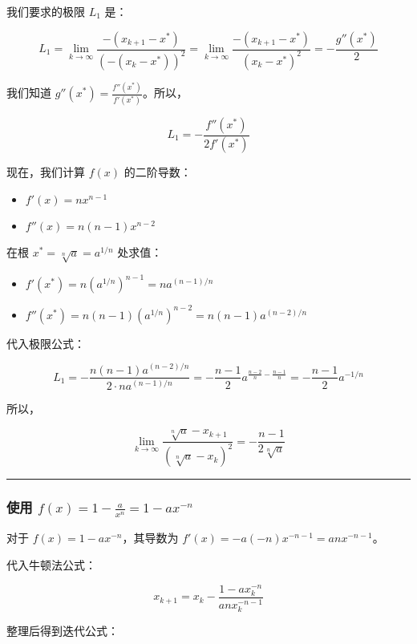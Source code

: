 \documentclass[11pt]{article}
\providecommand{\tightlist}{%
      \setlength{\itemsep}{0pt}\setlength{\parskip}{0pt}}
\begin{document}
我们要求的极限 \(L_1\) 是：

\[ L_1 = \lim_{k\to\infty} \frac{-(x_{k+1} - x^*)}{(-(x_k - x^*))^2} = \lim_{k\to\infty} \frac{-(x_{k+1} - x^*)}{(x_k - x^*)^2} = -\frac{g''(x^*)}{2} \]

我们知道 \(g''(x^*) = \frac{f''(x^*)}{f'(x^*)}\)。所以，

\[ L_1 = -\frac{f''(x^*)}{2f'(x^*)} \]

现在，我们计算 \(f(x)\) 的二阶导数：

\begin{itemize}
\tightlist
\item
  \(f'(x) = nx^{n-1}\)
\item
  \(f''(x) = n(n-1)x^{n-2}\)
\end{itemize}

在根 \(x^* = \sqrt[n]{a} = a^{1/n}\) 处求值：

\begin{itemize}
\tightlist
\item
  \(f'(x^*) = n(a^{1/n})^{n-1} = n a^{(n-1)/n}\)
\item
  \(f''(x^*) = n(n-1)(a^{1/n})^{n-2} = n(n-1)a^{(n-2)/n}\)
\end{itemize}

代入极限公式：

\[ L_1 = -\frac{n(n-1)a^{(n-2)/n}}{2 \cdot n a^{(n-1)/n}} = -\frac{n-1}{2} a^{\frac{n-2}{n} - \frac{n-1}{n}} = -\frac{n-1}{2} a^{-1/n} \]

所以，

\[ \lim_{k\to\infty} \frac{\sqrt[n] a - x_{k + 1}}{(\sqrt [n] a - x_k)^2} = -\frac{n-1}{2\sqrt[n]{a}} \]

\begin{center}\rule{0.5\linewidth}{0.5pt}\end{center}

\subsubsection{\texorpdfstring{使用
\(f(x) = 1 - \frac{a}{x^n} = 1 - ax^{-n}\)}{使用 f(x) = 1 - \textbackslash frac\{a\}\{x\^{}n\} = 1 - ax\^{}\{-n\}}}\label{ux4f7fux7528-fx-1---fracaxn-1---ax-n}

对于 \(f(x) = 1 - ax^{-n}\)，其导数为
\(f'(x) = -a(-n)x^{-n-1} = anx^{-n-1}\)。

代入牛顿法公式：

\[ x_{k+1} = x_k - \frac{1 - ax_k^{-n}}{anx_k^{-n-1}} \]

整理后得到迭代公式：
\end{document}
